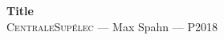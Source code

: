 \documentclass[12pt,oneside,a4paper]{article}
\begin{document}
\begin{center}
{\LARGE \bfseries
 Title \\[0.3cm]
}
{\large
  \textsc{CentraleSupélec} --- Max Spahn --- P2018\\[0.7cm]
}
\end{center}
\end{document}

